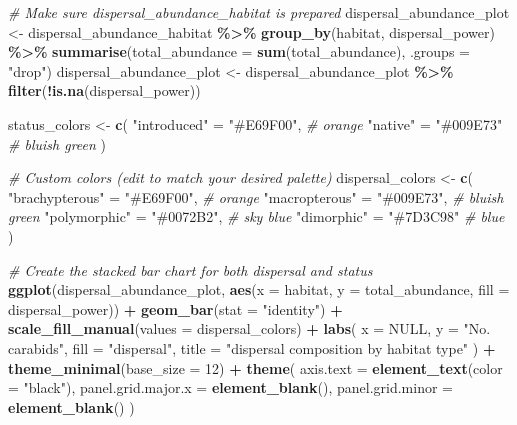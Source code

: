 \documentclass[
]{article}
\newenvironment{Shaded}{\begin{snugshade}}{\end{snugshade}}
\newcommand{\AttributeTok}[1]{\textcolor[rgb]{0.13,0.29,0.53}{#1}}
\newcommand{\CommentTok}[1]{\textcolor[rgb]{0.56,0.35,0.01}{\textit{#1}}}
\newcommand{\ConstantTok}[1]{\textcolor[rgb]{0.56,0.35,0.01}{#1}}
\newcommand{\DecValTok}[1]{\textcolor[rgb]{0.00,0.00,0.81}{#1}}
\newcommand{\FunctionTok}[1]{\textcolor[rgb]{0.13,0.29,0.53}{\textbf{#1}}}
\newcommand{\NormalTok}[1]{#1}
\newcommand{\OtherTok}[1]{\textcolor[rgb]{0.56,0.35,0.01}{#1}}
\newcommand{\SpecialCharTok}[1]{\textcolor[rgb]{0.81,0.36,0.00}{\textbf{#1}}}
\newcommand{\StringTok}[1]{\textcolor[rgb]{0.31,0.60,0.02}{#1}}
\begin{document}
\begin{Shaded}
\begin{Highlighting}[]
\CommentTok{\# Make sure dispersal\_abundance\_habitat is prepared}
\NormalTok{dispersal\_abundance\_plot }\OtherTok{\textless{}{-}}\NormalTok{ dispersal\_abundance\_habitat }\SpecialCharTok{\%\textgreater{}\%}
  \FunctionTok{group\_by}\NormalTok{(habitat, dispersal\_power) }\SpecialCharTok{\%\textgreater{}\%}
  \FunctionTok{summarise}\NormalTok{(}\AttributeTok{total\_abundance =} \FunctionTok{sum}\NormalTok{(total\_abundance), }\AttributeTok{.groups =} \StringTok{"drop"}\NormalTok{)}
\NormalTok{dispersal\_abundance\_plot }\OtherTok{\textless{}{-}}\NormalTok{ dispersal\_abundance\_plot }\SpecialCharTok{\%\textgreater{}\%}
  \FunctionTok{filter}\NormalTok{(}\SpecialCharTok{!}\FunctionTok{is.na}\NormalTok{(dispersal\_power))}

\NormalTok{status\_colors }\OtherTok{\textless{}{-}} \FunctionTok{c}\NormalTok{(}
  \StringTok{"introduced"} \OtherTok{=} \StringTok{"\#E69F00"}\NormalTok{,     }\CommentTok{\# orange}
  \StringTok{"native"} \OtherTok{=} \StringTok{"\#009E73"}     \CommentTok{\# bluish green}
\NormalTok{)}

\CommentTok{\# Custom colors (edit to match your desired palette)}
\NormalTok{dispersal\_colors }\OtherTok{\textless{}{-}} \FunctionTok{c}\NormalTok{(}
  \StringTok{"brachypterous"} \OtherTok{=} \StringTok{"\#E69F00"}\NormalTok{,     }\CommentTok{\# orange}
  \StringTok{"macropterous"} \OtherTok{=} \StringTok{"\#009E73"}\NormalTok{,     }\CommentTok{\# bluish green}
  \StringTok{"polymorphic"} \OtherTok{=} \StringTok{"\#0072B2"}\NormalTok{,     }\CommentTok{\# sky blue}
  \StringTok{"dimorphic"} \OtherTok{=} \StringTok{"\#7D3C98"}     \CommentTok{\# blue}
\NormalTok{)}

\CommentTok{\# Create the stacked bar chart for both dispersal and status}
\FunctionTok{ggplot}\NormalTok{(dispersal\_abundance\_plot, }\FunctionTok{aes}\NormalTok{(}\AttributeTok{x =}\NormalTok{ habitat, }\AttributeTok{y =}\NormalTok{ total\_abundance, }\AttributeTok{fill =}\NormalTok{ dispersal\_power)) }\SpecialCharTok{+}
  \FunctionTok{geom\_bar}\NormalTok{(}\AttributeTok{stat =} \StringTok{"identity"}\NormalTok{) }\SpecialCharTok{+}
  \FunctionTok{scale\_fill\_manual}\NormalTok{(}\AttributeTok{values =}\NormalTok{ dispersal\_colors) }\SpecialCharTok{+}
  \FunctionTok{labs}\NormalTok{(}
    \AttributeTok{x =} \ConstantTok{NULL}\NormalTok{,}
    \AttributeTok{y =} \StringTok{"No. carabids"}\NormalTok{,}
    \AttributeTok{fill =} \StringTok{"dispersal"}\NormalTok{,}
    \AttributeTok{title =} \StringTok{"dispersal composition by habitat type"}
\NormalTok{  ) }\SpecialCharTok{+}
  \FunctionTok{theme\_minimal}\NormalTok{(}\AttributeTok{base\_size =} \DecValTok{12}\NormalTok{) }\SpecialCharTok{+}
  \FunctionTok{theme}\NormalTok{(}
    \AttributeTok{axis.text =} \FunctionTok{element\_text}\NormalTok{(}\AttributeTok{color =} \StringTok{"black"}\NormalTok{),}
    \AttributeTok{panel.grid.major.x =} \FunctionTok{element\_blank}\NormalTok{(),}
    \AttributeTok{panel.grid.minor =} \FunctionTok{element\_blank}\NormalTok{()}
\NormalTok{  )}
\end{Highlighting}
\end{Shaded}
\end{document}
